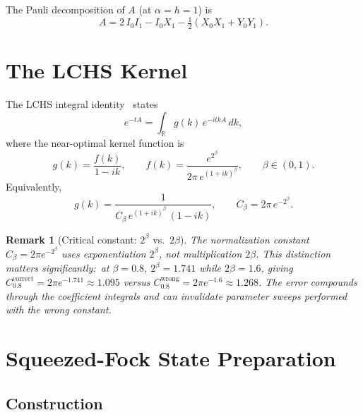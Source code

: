 \documentclass[11pt]{article}
\newtheorem{remark}{Remark}
\begin{document}
The Pauli decomposition of $A$ (at $\alpha = h = 1$) is
\begin{equation}
  A = 2\,I_0I_1 - I_0X_1 - \tfrac{1}{2}(X_0X_1 + Y_0Y_1).
\end{equation}

\section{The LCHS Kernel}

The LCHS integral identity~\cite{das2025} states
\begin{equation}\label{eq:lchs}
  e^{-tA} = \int_{\mathbb{R}} g(k)\,e^{-itkA}\,dk,
\end{equation}
where the near-optimal kernel function is
\begin{equation}\label{eq:kernel}
  g(k) = \frac{f(k)}{1-ik}, \qquad
  f(k) = \frac{e^{2^\beta}}{2\pi\,e^{(1+ik)^\beta}},
  \qquad \beta \in (0,1).
\end{equation}
Equivalently,
\begin{equation}\label{eq:g-combined}
  g(k) = \frac{1}{C_\beta\,e^{(1+ik)^\beta}\,(1-ik)},
  \qquad C_\beta = 2\pi\,e^{-2^\beta}.
\end{equation}

\begin{remark}[Critical constant: $2^\beta$ vs.\ $2\beta$]\label{rem:kernel-bug}
The normalization constant $C_\beta = 2\pi e^{-2^\beta}$ uses
\emph{exponentiation} $2^\beta$, not \emph{multiplication} $2\beta$.
This distinction matters significantly:\ at $\beta = 0.8$,
$2^\beta = 1.741$ while $2\beta = 1.6$, giving
$C_{0.8}^{\text{correct}} = 2\pi e^{-1.741} \approx 1.095$ versus
$C_{0.8}^{\text{wrong}} = 2\pi e^{-1.6} \approx 1.268$.
The error compounds through the coefficient integrals and can invalidate
parameter sweeps performed with the wrong constant.
\end{remark}

\section{Squeezed-Fock State Preparation}

\subsection{Construction}
\end{document}
